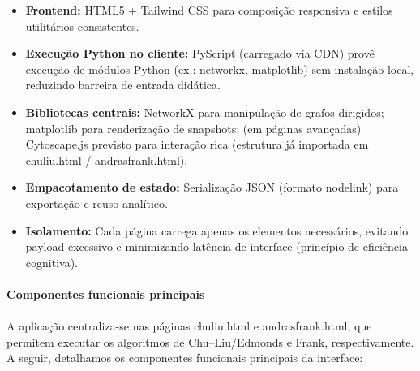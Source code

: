 \documentclass[12pt,a4paper]{article}
\def\texttt#1{#1}%
\def\emph#1{#1}%
\def\_{}%
\begin{document}
\begin{itemize}\setlength{\itemsep}{2pt}
    \item \textbf{Frontend:} HTML5 + Tailwind CSS para composição responsiva e estilos utilitários consistentes.
    \item \textbf{Execução Python no cliente:} PyScript (carregado via CDN) provê execução de módulos Python (ex.: \texttt{networkx}, \texttt{matplotlib}) sem instalação local, reduzindo barreira de entrada didática.
    \item \textbf{Bibliotecas centrais:} NetworkX para manipulação de grafos dirigidos; \texttt{matplotlib} para renderização de snapshots; (em páginas avançadas) Cytoscape.js previsto para interação rica (estrutura já importada em \texttt{chuliu.html} / \texttt{andrasfrank.html}).
    \item \textbf{Empacotamento de estado:} Serialização JSON (formato \texttt{node\_link}) para exportação e reuso analítico.
    \item \textbf{Isolamento:} Cada página carrega apenas os elementos necessários, evitando \emph{payload} excessivo e minimizando latência de interface (princípio de eficiência cognitiva).
\end{itemize}

\paragraph{Componentes funcionais principais}
\paragraph{}
A aplicação centraliza-se nas páginas \texttt{chuliu.html} e \texttt{andrasfrank.html}, que permitem executar os algoritmos de Chu--Liu/Edmonds e Frank, respectivamente. A seguir, detalhamos os componentes funcionais principais da interface:
\end{document}
